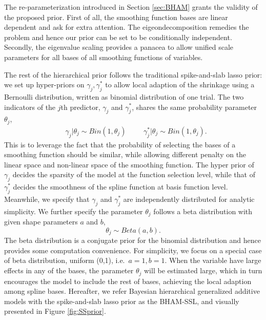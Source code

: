 \documentclass[AMA,STIX1COL,]{WileyNJD-v2}
\begin{document}
The re-parameterization introduced in Section \ref{sec:BHAM} grants the
validity of the proposed prior. First of all, the smoothing function
bases are linear dependent and ask for extra attention. The
eigeondecomposition remedies the problem and hence our prior can be set
to be conditionally independent. Secondly, the eigenvalue scaling
provides a panacea to allow unified scale parameters for all bases of
all smoothing functions of variables.

The rest of the hierarchical prior follows the traditional
spike-and-slab lasso prior: we set up hyper-priors on
\(\gamma_j, \gamma^*_j\) to allow local adaption of the shrinkage using
a Bernoulli distribution, written as binomial distribution of one trial.
The two indicators of the \(j\)th predictor, \(\gamma_j\) and
\(\gamma^*_j\), shares the same probability parameter \(\theta_j\), \[
\begin{aligned}
&\gamma_{j} | \theta_j \sim Bin(1, \theta_j) & & 
&\gamma_{j}^*| \theta_j \sim Bin(1, \theta_j).
\end{aligned}
\] This is to leverage the fact that the probability of selecting the
bases of a smoothing function should be similar, while allowing
different penalty on the linear space and non-linear space of the
smoothing function. The hyper prior of \(\gamma_{j}\) decides the
sparsity of the model at the function selection level, while that of
\(\gamma_{j}^*\) decides the smoothness of the spline function at basis
function level. Meanwhile, we specify that \(\gamma_{j}\) and
\(\gamma_{j}^*\) are independently distributed for analytic simplicity.
We further specify the parameter \(\theta_j\) follows a beta
distribution with given shape parameters \(a\) and \(b\), \[
\theta_j \sim Beta(a, b).
\] The beta distribution is a conjugate prior for the binomial
distribution and hence provides some computation convenience. For
simplicity, we focus on a special case of beta distribution, uniform
(0,1), i.e.~\(a = 1, b = 1\). When the variable have large effects in
any of the bases, the parameter \(\theta_j\) will be estimated large,
which in turn encourages the model to include the rest of bases,
achieving the local adaption among spline bases. Hereafter, we refer
Bayesian hierarchical generalized additive models with the
spike-and-slab lasso prior as the BHAM-SSL, and visually presented in
Figure \ref{fig:SSprior}.
\end{document}
